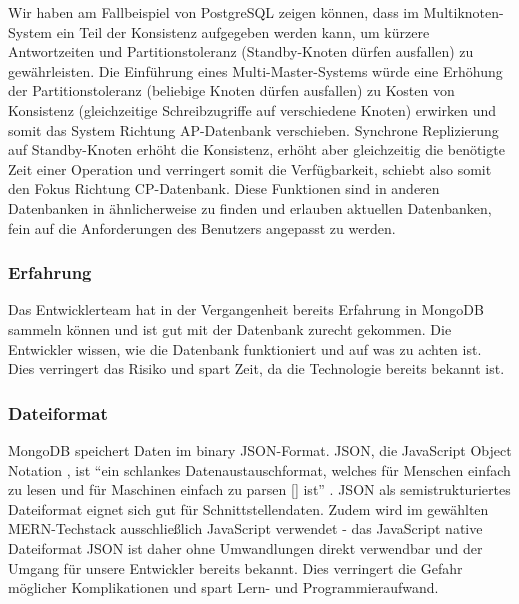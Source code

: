 Wir haben am Fallbeispiel von PostgreSQL zeigen können, dass im Multiknoten-System ein Teil der Konsistenz aufgegeben werden kann, um kürzere Antwortzeiten und Partitionstoleranz (Standby-Knoten dürfen ausfallen) zu gewährleisten. Die Einführung eines Multi-Master-Systems würde eine Erhöhung der Partitionstoleranz (beliebige Knoten dürfen ausfallen) zu Kosten von Konsistenz (gleichzeitige Schreibzugriffe auf verschiedene Knoten) erwirken und somit das System Richtung AP-Datenbank verschieben. Synchrone Replizierung auf Standby-Knoten erhöht die Konsistenz, erhöht aber gleichzeitig die benötigte Zeit einer Operation und verringert somit die Verfügbarkeit, schiebt also somit den Fokus Richtung CP-Datenbank. Diese Funktionen sind in anderen Datenbanken in ähnlicherweise zu finden und erlauben aktuellen Datenbanken, fein auf die Anforderungen des Benutzers angepasst zu werden.

\subsubsection{Erfahrung}
Das Entwicklerteam hat in der Vergangenheit bereits Erfahrung in MongoDB sammeln können und ist gut mit der Datenbank zurecht gekommen. Die Entwickler wissen, wie die Datenbank funktioniert und auf was zu achten ist. Dies verringert das Risiko und spart Zeit, da die Technologie bereits bekannt ist.

\subsubsection{Dateiformat}
MongoDB speichert Daten im \glqq binary JSON\grqq -Format. JSON, die \glqq JavaScript Object Notation \grqq, ist \enquote{ein schlankes Datenaustauschformat, welches für Menschen einfach zu lesen und für Maschinen einfach zu parsen [] ist} \cite{JSON1}. JSON als semistrukturiertes Dateiformat eignet sich gut für Schnittstellendaten. Zudem wird im gewählten MERN-Techstack ausschließlich JavaScript verwendet - das JavaScript native Dateiformat JSON ist daher ohne Umwandlungen direkt verwendbar und der Umgang für unsere Entwickler bereits bekannt. Dies verringert die Gefahr möglicher Komplikationen und spart Lern- und Programmieraufwand.

